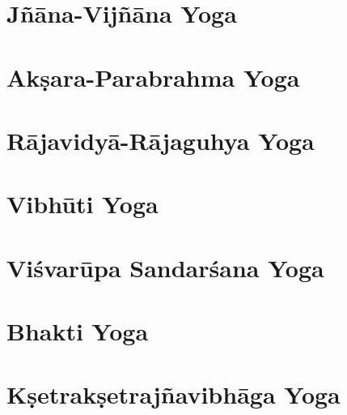 \documentclass[headings=small]{scrbook}
\begin{document}
\chapter{Jñāna-Vijñāna Yoga}
\begin{multicols}{2}
    
\end{multicols}

\chapter{Akṣara-Parabrahma Yoga}
\begin{multicols}{2}
    
\end{multicols}

\chapter{Rājavidyā-Rājaguhya Yoga}
\begin{multicols}{2}
    
\end{multicols}

\chapter{Vibhūti Yoga}
\begin{multicols}{2}
    
\end{multicols}

\chapter{Viśvarūpa Sandarśana Yoga}
\begin{multicols}{2}
    
\end{multicols}

\chapter{Bhakti Yoga}
\begin{multicols}{2}
    
\end{multicols}

\chapter{Kṣetrakṣetrajñavibhāga Yoga}
\begin{multicols}{2}
    
\end{multicols}
\end{document}
